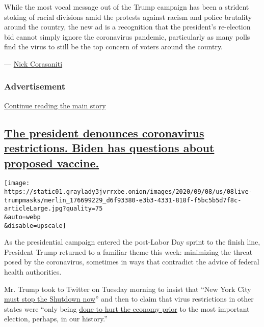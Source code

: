 While the most vocal message out of the Trump campaign has been a
strident stoking of racial divisions amid the protests against racism
and police brutality around the country, the new ad is a recognition
that the president's re-election bid cannot simply ignore the
coronavirus pandemic, particularly as many polls find the virus to still
be the top concern of voters around the country.

--- \href{https://www.nytimes3xbfgragh.onion/by/nick-corasaniti}{Nick
Corasaniti}

\hypertarget{advertisement-1}{%
\subsubsection{Advertisement}\label{advertisement-1}}

\protect\hyperlink{after-dfp-ad-mid2}{Continue reading the main story}

\hypertarget{the-president-denounces-coronavirus-restrictions-biden-has-questions-about-proposed-vaccine}{%
\subsection{\texorpdfstring{\protect\hyperlink{the-president-denounces-coronavirus-restrictions-biden-has-questions-about-proposed-vaccine}{The
president denounces coronavirus restrictions. Biden has questions about
proposed
vaccine.}}{The president denounces coronavirus restrictions. Biden has questions about proposed vaccine.}}\label{the-president-denounces-coronavirus-restrictions-biden-has-questions-about-proposed-vaccine}}

\texttt{[image: https://static01.graylady3jvrrxbe.onion/images/2020/09/08/us/08live-trumpmasks/merlin\_176699229\_d6f93380-e3b3-4331-818f-f5bc5b5d7f8c-articleLarge.jpg?quality=75\\\&auto=webp\\\&disable=upscale]}

As the presidential campaign entered the post-Labor Day sprint to the
finish line, President Trump returned to a familiar theme this week:
minimizing the threat posed by the coronavirus, sometimes in ways that
contradict the advice of federal health authorities.

Mr. Trump took to Twitter on Tuesday morning to insist that ``New York
City
\href{https://twitter.com/realDonaldTrump/status/1303305303249870854?s=20}{must
stop the Shutdown now}'' and then to claim that virus restrictions in
other states were ``only being
\href{https://twitter.com/realDonaldTrump/status/1303313054281666584?s=20}{done
to hurt the economy prior} to the most important election, perhaps, in
our history.''

